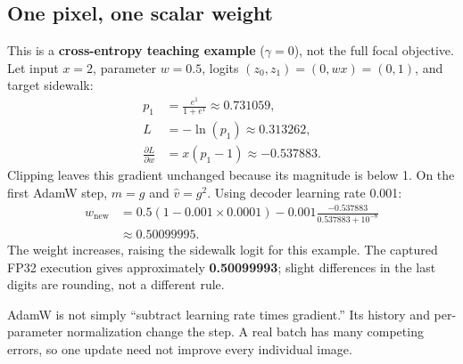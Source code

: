 \documentclass[11pt,letterpaper]{article}
\newcommand{\note}[1]{\par\vspace{3pt}\begingroup\setlength{\fboxsep}{8pt}%
 \colorbox{pale}{\parbox{\dimexpr\linewidth-2\fboxsep\relax}{#1}}\endgroup\par\vspace{3pt}}
\begin{document}
\subsection*{One pixel, one scalar weight}
This is a \textbf{cross-entropy teaching example} ($\gamma=0$), not the full focal objective. Let input $x=2$, parameter $w=0.5$, logits $(z_0,z_1)=(0,wx)=(0,1)$, and target sidewalk:
\begin{align*}
p_1&=\frac{e^1}{1+e^1}\approx0.731059,\\
L&=-\ln(p_1)\approx0.313262,\\
\frac{\partial L}{\partial w}&=x(p_1-1)\approx-0.537883.
\end{align*}
Clipping leaves this gradient unchanged because its magnitude is below 1. On the first AdamW step, $\widehat m=g$ and $\widehat v=g^2$. Using decoder learning rate 0.001:
\begin{align*}
w_{\mathrm{new}}&=0.5(1-0.001\times0.0001)
-0.001\frac{-0.537883}{0.537883+10^{-8}}\\
&\approx0.50099995.
\end{align*}
The weight increases, raising the sidewalk logit for this example. The captured FP32 execution gives approximately \textbf{0.50099993}; slight differences in the last digits are rounding, not a different rule.

\note{AdamW is not simply ``subtract learning rate times gradient.'' Its history and per-parameter normalization change the step. A real batch has many competing errors, so one update need not improve every individual image.}
\end{document}
